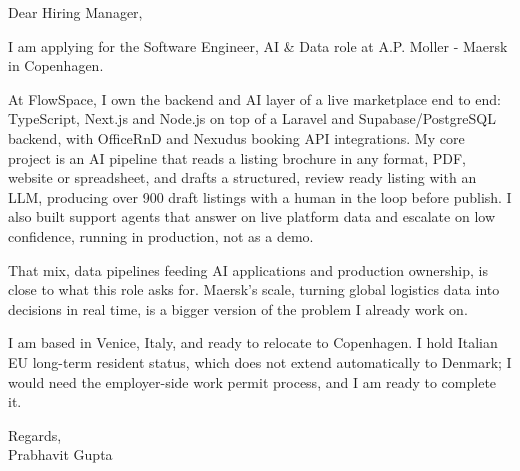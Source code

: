 \documentclass[a4paper,11pt]{article}
\begin{document}
Dear Hiring Manager,

I am applying for the Software Engineer, AI \& Data role at A.P. Moller - Maersk in Copenhagen.

At FlowSpace, I own the backend and AI layer of a live marketplace end to end: TypeScript, Next.js and Node.js on top of a Laravel and Supabase/PostgreSQL backend, with OfficeRnD and Nexudus booking API integrations. My core project is an AI pipeline that reads a listing brochure in any format, PDF, website or spreadsheet, and drafts a structured, review ready listing with an LLM, producing over 900 draft listings with a human in the loop before publish. I also built support agents that answer on live platform data and escalate on low confidence, running in production, not as a demo.

That mix, data pipelines feeding AI applications and production ownership, is close to what this role asks for. Maersk's scale, turning global logistics data into decisions in real time, is a bigger version of the problem I already work on.

I am based in Venice, Italy, and ready to relocate to Copenhagen. I hold Italian EU long-term resident status, which does not extend automatically to Denmark; I would need the employer-side work permit process, and I am ready to complete it.

Regards,\\
Prabhavit Gupta
\end{document}
